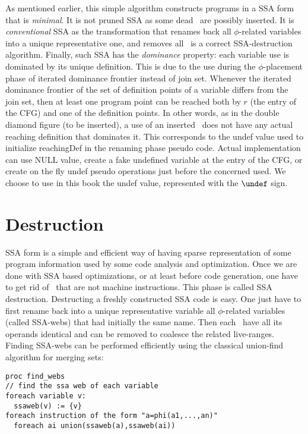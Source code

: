 As mentioned earlier, this simple algorithm constructs programs in a SSA form that is \textit{minimal}. It is not pruned SSA as some dead \phiops\ are possibly inserted. 
It is \textit{conventional} SSA as the transformation that renames back all $\phi$-related variables into a unique representative one, and removes all \phiops\ is a correct SSA-destruction algorithm.
Finally, such SSA has the \textit{dominance} property: each variable use is dominated by its unique definition. This is due to the use during the $\phi$-placement phase of iterated dominance frontier instead of join set. Whenever the iterated dominance frontier of the set of definition points of a variable differs from the join set, then at least one program point can be reached both by $r$ (the entry of the CFG) and one of the definition points. In other words, as in the double diamond figure (to be inserted), a use of an inserted \phiop\ does not have any actual reaching definition that dominates it. This corresponds to the undef value used to initialize reachingDef in the renaming phase pseudo code. Actual implementation can use NULL value, create a fake undefined variable at the entry of the CFG, or create on the fly undef pseudo operations just before the concerned used. We choose to use in this book the undef value, represented with the $\undef$ sign.


\section{Destruction }
\label{sec:classical_destruction}

SSA form is a simple and efficient way of having sparse representation of some program information used by some code analysis and optimization. Once we are done with SSA based optimizations, or at least before code generation, one have to get rid of \phiops\ that are not machine instructions. This phase is called SSA destruction. 
Destructing a freshly constructed SSA code is easy. One just have to first rename back into a unique representative variable all $\phi$-related variables (called SSA-webs) that had initially the same name. Then each \phiop\ have all its operands identical and can be removed to coalesce the related live-ranges.
Finding SSA-webs can be performed efficiently using the classical union-find algorithm for merging sets:
\begin{verbatim}
proc find_webs
// find the ssa web of each variable
foreach variable v:
  ssaweb(v) := {v}
foreach instruction of the form "a=phi(a1,...,an)"
  foreach ai union(ssaweb(a),ssaweb(ai))
\end{verbatim}

